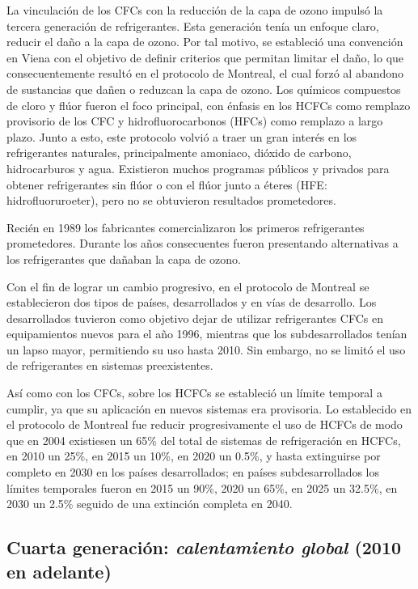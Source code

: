	La vinculación de los CFCs con la reducción de la capa de ozono impulsó la tercera generación de refrigerantes. Esta generación tenía un enfoque claro, reducir el daño a la capa de ozono. Por tal motivo, se estableció una convención en Viena con el objetivo de definir criterios que permitan limitar el daño, lo que consecuentemente resultó en el protocolo de Montreal, el cual forzó al abandono de sustancias que dañen o reduzcan la capa de ozono. Los químicos compuestos de cloro y flúor fueron el foco principal, con énfasis en los HCFCs como remplazo provisorio de los CFC y hidrofluorocarbonos (HFCs) como remplazo a largo plazo. Junto a esto, este protocolo volvió a traer un gran interés en los refrigerantes naturales, principalmente amoniaco, dióxido de carbono, hidrocarburos y agua. Existieron muchos programas públicos y privados para obtener refrigerantes sin flúor o con el flúor junto a éteres (HFE: hidrofluoruroeter), pero no se obtuvieron resultados prometedores.
	
	Recién en 1989 los fabricantes comercializaron los primeros refrigerantes prometedores. Durante los años consecuentes fueron presentando alternativas a los refrigerantes que dañaban la capa de ozono.

	Con el fin de lograr un cambio progresivo, en el protocolo de Montreal se establecieron dos tipos de países, desarrollados y en vías de desarrollo. Los desarrollados tuvieron como objetivo dejar de utilizar refrigerantes CFCs en equipamientos nuevos para el año 1996, mientras que los subdesarrollados tenían un lapso mayor, permitiendo su uso hasta 2010. Sin embargo, no se limitó el uso de refrigerantes en sistemas preexistentes. 

	Así como con los CFCs, sobre los HCFCs se estableció un límite temporal a cumplir, ya que su aplicación en nuevos sistemas era provisoria. Lo establecido en el protocolo de Montreal fue reducir progresivamente el uso de HCFCs de modo que en 2004 existiesen un 65\% del total de sistemas de refrigeración en HCFCs, en 2010 un 25\%, en 2015 un 10\%, en 2020 un 0.5\%, y hasta extinguirse por completo en 2030 en los países desarrollados; en países subdesarrollados los límites temporales fueron en 2015 un 90\%, 2020 un 65\%, en 2025 un 32.5\%, en 2030 un 2.5\% seguido de una extinción completa en 2040.

	\subsection{Cuarta generación: \emph{calentamiento global}  (2010 en adelante)}

